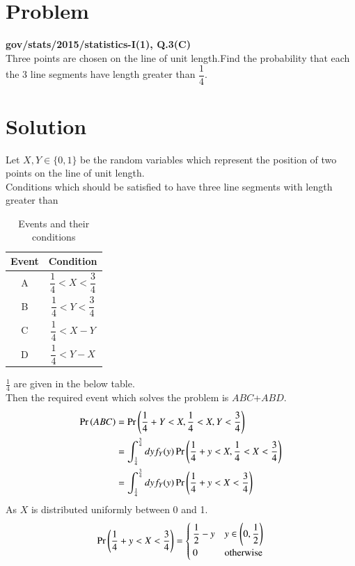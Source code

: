 \documentclass[journal,12pt,twocolumn]{IEEEtran}
\begin{document}
\section{Problem}
\textbf{gov/stats/2015/statistics-I(1), Q.3(C)}\\
  Three points are chosen on the line of unit length.Find the probability that each the 3 line segments have length greater than $\dfrac{1}{4}$.
\section{Solution}
Let $X,Y \in \{0,1\}$ be the random variables which represent the position of two points on the line of unit length.\\
Conditions which should be satisfied to have three line segments with length greater than 
\begin{table}[h]
\centering
\bgroup
\def\arraystretch{2}
\begin{tabular}{|c|c|}
\hline
\textbf{Event} & \textbf{Condition}                     \\\hline
A              & $\dfrac{1}{4}<X<\dfrac{3}{4}$ \\[1ex] \hline
B              & $\dfrac{1}{4}<Y<\dfrac{3}{4}$ \\[1ex] \hline
C              & $\dfrac{1}{4}<X-Y$ \\[1ex] \hline
D           & $\dfrac{1}{4}<Y-X$ \\[1ex] \hline
\end{tabular}
\egroup
\caption{Events and their conditions}
\label{tab:Events}
\end{table}
$\frac{1}{4}$ are given in the below table.\\
Then the required event which solves the problem is $ABC$+$ABD$.
\begin{align}
    \Pr\left(ABC\right)&=\Pr\left(\frac{1}{4}+Y<X,\frac{1}{4}<X,Y<\frac{3}{4}\right)\\
    &=\int_{\frac{1}{4}}^{\frac{3}{4}}dyf_Y(y) \Pr\left(\frac{1}{4}+y<X,\frac{1}{4}<X<\frac{3}{4}\right)\\
     &=\int_{\frac{1}{4}}^{\frac{3}{4}}dyf_Y(y)\Pr\left(\frac{1}{4}+y<X<\frac{3}{4}\right)\label{step2}
     \end{align}
     As $X$ is distributed uniformly between 0 and 1.
     \begin{align}
        \Pr\left(\frac{1}{4}+y<X<\frac{3}{4}\right)=\begin{cases}
        \dfrac{1}{2}-y&y\in \left(0,\dfrac{1}{2}\right)\\
        0&\text{otherwise}
        \end{cases}\label{step2help}
     \end{align}
\end{document}
